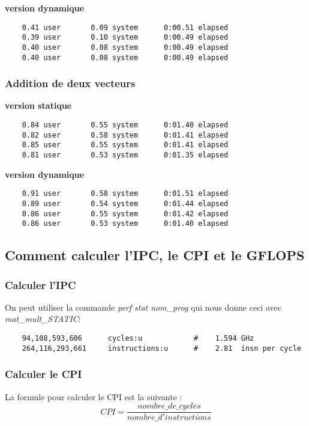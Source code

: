 \documentclass{rapport}
\begin{document}
  \newline
  \newline
  \textbf{version dynamique}
  \begin{lstlisting}
    0.41 user       0.09 system      0:00.51 elapsed
    0.39 user       0.10 system      0:00.49 elapsed
    0.40 user       0.08 system      0:00.49 elapsed
    0.40 user       0.08 system      0:00.49 elapsed
  \end{lstlisting}

  \subsubsection{Addition de deux vecteurs}
  \textbf{version statique}
  \begin{lstlisting}
    0.84 user       0.55 system      0:01.40 elapsed
    0.82 user       0.58 system      0:01.41 elapsed
    0.85 user       0.55 system      0:01.41 elapsed
    0.81 user       0.53 system      0:01.35 elapsed
  \end{lstlisting}
  \newline
  \newline
  \textbf{version dynamique}
  \begin{lstlisting}
    0.91 user       0.58 system      0:01.51 elapsed
    0.89 user       0.54 system      0:01.44 elapsed
    0.86 user       0.55 system      0:01.42 elapsed
    0.86 user       0.53 system      0:01.40 elapsed
  \end{lstlisting}
  
  \subsection{Comment calculer l'IPC, le CPI et le GFLOPS}
  
  \subsubsection{Calculer l'IPC}
  On peut utiliser la commande \textit{perf stat \<nom\_prog\>} qui nous donne ceci avec \textit{mat\_mult\_STATIC}:
  \begin{lstlisting}
    94,108,593,606      cycles:u            #    1.594 GHz                 
    264,116,293,661     instructions:u      #    2.81  insn per cycle
  \end{lstlisting}

  \subsubsection{Calculer le CPI}
  La formule pour calculer le CPI est la suivante :
  \[
    CPI = \frac{nombre\_de\_cycles}{nombre\_d'instructions}
  \]
\end{document}
